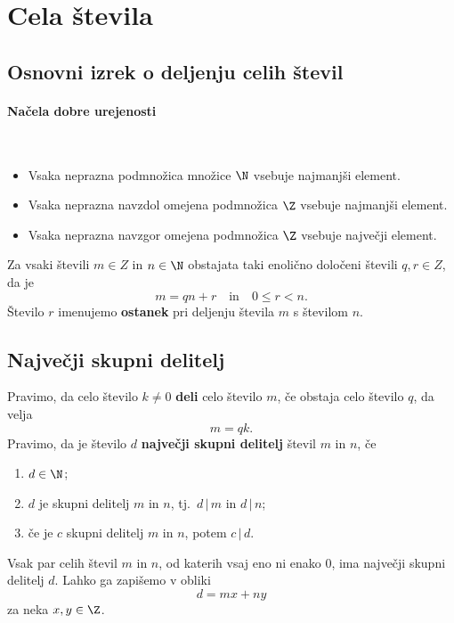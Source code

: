 \section{Cela števila}
\subsection{Osnovni izrek o deljenju celih števil}
\paragraph{Načela dobre urejenosti} \ 
\begin{itemize}
    \item Vsaka neprazna podmnožica množice \(\N\) vsebuje najmanjši element.
    \item Vsaka neprazna navzdol omejena podmnožica \(\Z\) vsebuje najmanjši element.
    \item Vsaka neprazna navzgor omejena podmnožica \(\Z\) vsebuje največji element.
\end{itemize}

\begin{izrek}
    Za vsaki števili \(m \in Z\) in \(n \in \N\) obstajata taki enolično določeni števili \(q, r \in Z\), da je 
    \[m = qn + r \quad \text{in} \quad 0 \leq r < n.\]
    Število \(r\) imenujemo \textbf{ostanek} pri deljenju števila \(m\) s številom \(n\).
\end{izrek}

\subsection{Največji skupni delitelj}
\begin{definicija}
    Pravimo, da celo število \(k \neq 0\) \textbf{deli} celo število \(m\), če obstaja celo število \(q\), da velja 
    \[m = qk.\]
    Pravimo, da je število \(d\) \textbf{največji skupni delitelj} števil \(m\) in \(n\), če 
    \begin{enumerate}
        \item \(d \in \N\);
        \item \(d\) je skupni delitelj \(m\) in \(n\), tj.\ \(d\, |\, m\) in \(d\, |\, n\);
        \item če je \(c\) skupni delitelj \(m\) in \(n\), potem \(c\, |\, d\).
    \end{enumerate}
\end{definicija}

\begin{izrek}
    Vsak par celih števil \(m\) in \(n\), od katerih vsaj eno ni enako \(0\), ima največji skupni delitelj \(d\). Lahko ga zapišemo v obliki
    \[d = mx+ny\]
    za neka \(x, y \in \Z\).
\end{izrek}

